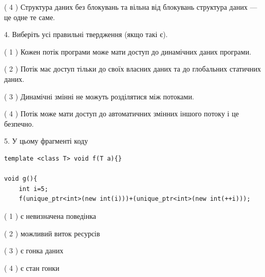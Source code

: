 \documentclass[12pt, ukrainian]{article}
\begin{document}
\begin {large}
{( 4 ) Структура даних без блокувань та вільна від блокувань структура даних --- це одне те саме.%


4. Виберіть усі правильні твердження (якщо такі є).\par
\vspace{2mm}

( 1 ) Кожен потік програми може мати доступ до динамічних даних програми.%

( 2 ) Потік має доступ тільки до своїх власних даних та до глобальних статичних даних.%

( 3 ) Динамічні змінні не можуть розділятися між потоками.%

( 4 ) Потік може мати доступ до автоматичних змінних іншого потоку і це безпечно.%


5. У цьому фрагменті коду
\begin{verbatim}
template <class T> void f(T a){}

void g(){
    int i=5;
    f(unique_ptr<int>(new int(i)))+(unique_ptr<int>(new int(++i)));
\end{verbatim}
( 1 ) є невизначена поведінка%

( 2 ) можливий виток ресурсів%

( 3 ) є гонка даних%

( 4 ) є стан гонки%
}
\end {large}
\end{document}

